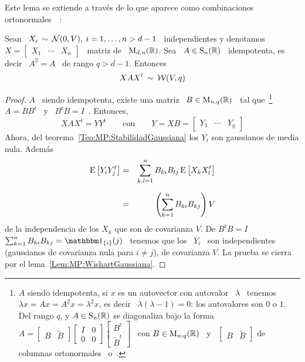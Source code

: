 Este  lema  se  extiende  a  trav\'es  de  lo  que  aparece  como  combinaciones
ortonormales~~\cite{Mui82, GupNag99, BilBre99, And03, Seb04, KotNad04}:
%
\begin{lema}\label{Lem:MP:WishartGaussianaIdempotenta}
%
  Sean \ $X_i \, \sim \, \mathcal{N}(0,V), \: i = 1, \ldots , n > d-1$ \ independientes y
  denotamos \ $X = \begin{bmatrix} X_1 & \cdots & X_n \end{bmatrix}$ \ matriz de
  \ $\mathrm{M}_{d,n}(\mathbb{R})$. Sea  \ $A \in \mathrm{S}_n(\mathbb{R})$ \  idempotenta, es decir \
  $A^2 = A$ \ de rango $q > d-1$. Entonces
  \[
  X A X^t \,\sim \, \mathcal{W}(V,q)
  \]
\end{lema}
%
\begin{proof}
  $A$ \  siendo idempotenta, existe una  matriz \ $B \in  \mathrm{M}_{n,q}(\mathbb{R})$ \ tal
  que~\footnote{$A$ siendo idempotenta, si $x$  es un autovector con autovalor \
    $\lambda$ \ tenemos  \ $\lambda x = A x  = A^2 x = \lambda^2  x$, es decir \
    $\lambda (\lambda-1) = 0$: los autovalores  son $0$ o $1$.  Del rango $q$, y
    $A \in \mathrm{S}_n(\mathbb{R})$  se diagonaliza bajo la forma \ $A  = \begin{bmatrix} B &
      \widetilde{B}   \end{bmatrix}    \begin{bmatrix}   I   &   0    \\   0   &
      0 \end{bmatrix} \begin{bmatrix} B^t\\ \widetilde{B}^t \end{bmatrix}$ \ con
    $B    \in     \mathrm{M}_{n,q}(\mathbb{R})$    \    y    \     $\begin{bmatrix}    B    &
      \widetilde{B}             \end{bmatrix}$            de            columnas
    ortonormales~\cite[Teo.~21.5.7]{Har08} o~\cite{HorJoh13}.}  \  $A = B B^t$ \
  y \ $B^t B = I$~\cite{Har08}. Entonces,
  \[
  X A  X^t =  Y Y^t \qquad  \mbox{con} \qquad Y  = X  B = \begin{bmatrix}  Y_1 &
    \cdots & Y_q \end{bmatrix}
  \]
  Ahora,    del   teorema~\ref{Teo:MP:StabilidadGaussiana}    los    $Y_i$   son
  gaussianos de media nula. Adem\'as
  \begin{eqnarray*}
  \operatorname{E}\left[ Y_i Y_j^t \right] & = & \sum_{k,l=1}^n B_{ki} B_{lj} \operatorname{E}\left[ X_k
  X_l^t \right]\\[2mm]
  & = & \left( \sum_{k=1}^n B_{ki} B_{kj} \right) V
  \end{eqnarray*}
  de la independencia de los $X_k$ que son de covarianza $V$. De $B^t B = I$ \ie
  \ $\sum_{k=1}^n  B_{ki} B_{kj} = \un_{\{i\}}(j)$  \ tenemos que los  \ $Y_i$ \
  son  independientes  (gaussianos  de  covarianza  nula para  $i  \ne  j$),  de
  covarianza      $V$.       La      prueba      se      cierra      por      el
  lema~\ref{Lem:MP:WishartGaussiana}.
\end{proof}
